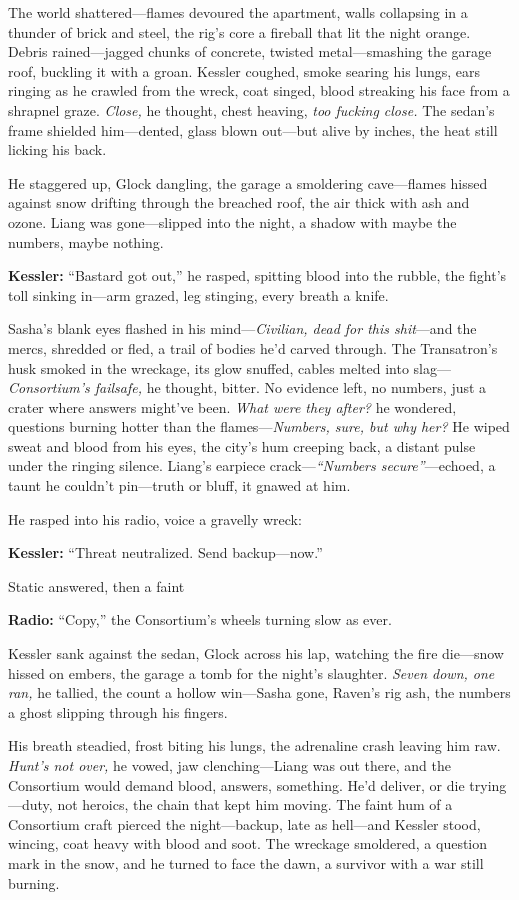 \documentclass[12pt]{book}
\begin{document}
The world shattered—flames devoured the apartment, walls collapsing in a thunder of brick and steel, the rig’s core a fireball that lit the night orange. Debris rained—jagged chunks of concrete, twisted metal—smashing the garage roof, buckling it with a groan. Kessler coughed, smoke searing his lungs, ears ringing as he crawled from the wreck, coat singed, blood streaking his face from a shrapnel graze. \emph{Close,} he thought, chest heaving, \emph{too fucking close.} The sedan’s frame shielded him—dented, glass blown out—but alive by inches, the heat still licking his back.

He staggered up, Glock dangling, the garage a smoldering cave—flames hissed against snow drifting through the breached roof, the air thick with ash and ozone. Liang was gone—slipped into the night, a shadow with maybe the numbers, maybe nothing. 

\vspace{0.5em}
\textbf{Kessler:} “Bastard got out,” he rasped, spitting blood into the rubble, the fight’s toll sinking in—arm grazed, leg stinging, every breath a knife.

Sasha’s blank eyes flashed in his mind—\emph{Civilian, dead for this shit}—and the mercs, shredded or fled, a trail of bodies he’d carved through. The Transatron’s husk smoked in the wreckage, its glow snuffed, cables melted into slag—\emph{Consortium’s failsafe,} he thought, bitter. No evidence left, no numbers, just a crater where answers might’ve been. \emph{What were they after?} he wondered, questions burning hotter than the flames—\emph{Numbers, sure, but why her?} He wiped sweat and blood from his eyes, the city’s hum creeping back, a distant pulse under the ringing silence. Liang’s earpiece crack—\emph{“Numbers secure”}—echoed, a taunt he couldn’t pin—truth or bluff, it gnawed at him.

He rasped into his radio, voice a gravelly wreck: 

\vspace{0.5em}
\textbf{Kessler:} “Threat neutralized. Send backup—now.”

Static answered, then a faint 

\vspace{0.5em}
\textbf{Radio:} “Copy,” the Consortium’s wheels turning slow as ever.

Kessler sank against the sedan, Glock across his lap, watching the fire die—snow hissed on embers, the garage a tomb for the night’s slaughter. \emph{Seven down, one ran,} he tallied, the count a hollow win—Sasha gone, Raven’s rig ash, the numbers a ghost slipping through his fingers.

His breath steadied, frost biting his lungs, the adrenaline crash leaving him raw. \emph{Hunt’s not over,} he vowed, jaw clenching—Liang was out there, and the Consortium would demand blood, answers, something. He’d deliver, or die trying—duty, not heroics, the chain that kept him moving. The faint hum of a Consortium craft pierced the night—backup, late as hell—and Kessler stood, wincing, coat heavy with blood and soot. The wreckage smoldered, a question mark in the snow, and he turned to face the dawn, a survivor with a war still burning.

\vspace{1em}
\end{document}
